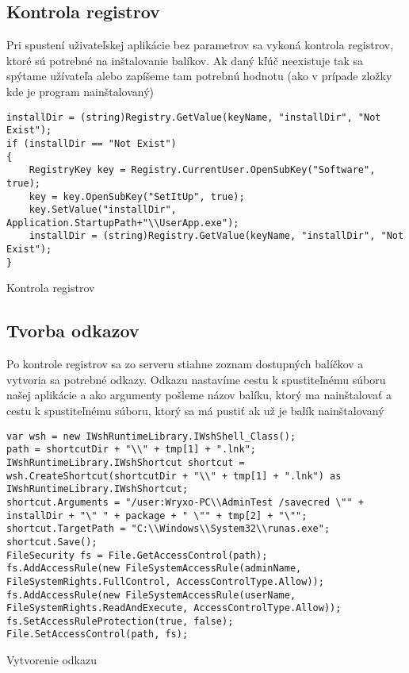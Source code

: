 \subsection{Kontrola registrov}
Pri spustení uživateľskej aplikácie bez parametrov sa vykoná kontrola registrov, ktoré sú potrebné na inštalovanie balíkov. Ak daný kľúč neexistuje tak sa spýtame užívateľa alebo zapíšeme tam potrebnú hodnotu (ako v prípade zložky kde je program nainštalovaný)

\begin{listing}
\begin{verbatim}
installDir = (string)Registry.GetValue(keyName, "installDir", "Not Exist");
if (installDir == "Not Exist")
{
    RegistryKey key = Registry.CurrentUser.OpenSubKey("Software", true);
    key = key.OpenSubKey("SetItUp", true);
    key.SetValue("installDir", Application.StartupPath+"\\UserApp.exe");
    installDir = (string)Registry.GetValue(keyName, "installDir", "Not Exist");
}      
\end{verbatim}
\caption{Kontrola registrov}
\label{lst:regcheck}
\end{listing}

\subsection{Tvorba odkazov}
Po kontrole registrov sa zo serveru stiahne zoznam dostupných balíčkov a vytvoria sa potrebné odkazy. Odkazu nastavíme cestu k spustiteľnému súboru našej aplikácie a ako argumenty pošleme názov balíku, ktorý ma nainštalovať a cestu k spustiteľnému súboru, ktorý sa má pustiť ak už je balík nainštalovaný

\begin{listing}
\begin{verbatim}
var wsh = new IWshRuntimeLibrary.IWshShell_Class();
path = shortcutDir + "\\" + tmp[1] + ".lnk";
IWshRuntimeLibrary.IWshShortcut shortcut = wsh.CreateShortcut(shortcutDir + "\\" + tmp[1] + ".lnk") as IWshRuntimeLibrary.IWshShortcut;
shortcut.Arguments = "/user:Wryxo-PC\\AdminTest /savecred \"" + installDir + "\" " + package + " \"" + tmp[2] + "\"";
shortcut.TargetPath = "C:\\Windows\\System32\\runas.exe";
shortcut.Save();                    
FileSecurity fs = File.GetAccessControl(path);
fs.AddAccessRule(new FileSystemAccessRule(adminName, FileSystemRights.FullControl, AccessControlType.Allow));
fs.AddAccessRule(new FileSystemAccessRule(userName, FileSystemRights.ReadAndExecute, AccessControlType.Allow));
fs.SetAccessRuleProtection(true, false);
File.SetAccessControl(path, fs);   
\end{verbatim}
\caption{Vytvorenie odkazu}
\label{lst:shortcut}
\end{listing}

